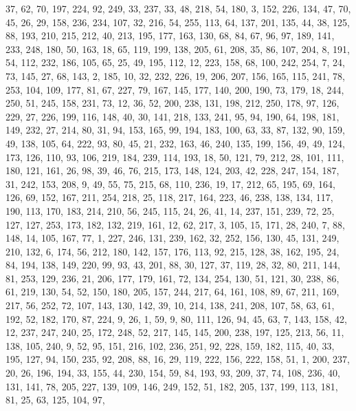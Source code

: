 \begin{DoxyCode}
       37, 62, 70, 197, 224, 92, 249, 33, 237, 33, 48, 218, 54, 180, 3, 152, 226, 134, 47, 70, 45, 26, 29, 158, 236,
       234, 107, 32, 216, 54, 255, 113, 64, 137, 201, 135, 44, 38, 125, 88, 193, 210, 215, 212, 40, 213, 195, 177,
       163, 130, 68, 84, 67, 96, 97, 189, 141, 233, 248, 180, 50, 163, 18, 65, 119, 199, 138, 205, 61, 208, 35, 86,
       107, 204, 8, 191, 54, 112, 232, 186, 105, 65, 25, 49, 195, 112, 12, 223, 158, 68, 100, 242, 254, 7, 24, 73,
       145, 27, 68, 143, 2, 185, 10, 32, 232, 226, 19, 206, 207, 156, 165, 115, 241, 78, 253, 104, 109, 177, 81,
       67, 227, 79, 167, 145, 177, 140, 200, 190, 73, 179, 18, 244, 250, 51, 245, 158, 231, 73, 12, 36, 52, 200,
       238, 131, 198, 212, 250, 178, 97, 126, 229, 27, 226, 199, 116, 148, 40, 30, 141, 218, 133, 241, 95, 94, 190,
       64, 198, 181, 149, 232, 27, 214, 80, 31, 94, 153, 165, 99, 194, 183, 100, 63, 33, 87, 132, 90, 159, 49, 138,
       105, 64, 222, 93, 80, 45, 21, 232, 163, 46, 240, 135, 199, 156, 49, 49, 124, 173, 126, 110, 93, 106, 219,
       184, 239, 114, 193, 18, 50, 121, 79, 212, 28, 101, 111, 180, 121, 161, 26, 98, 39, 46, 76, 215, 173, 148, 124,
       203, 42, 228, 247, 154, 187, 31, 242, 153, 208, 9, 49, 55, 75, 215, 68, 110, 236, 19, 17, 212, 65, 195, 69,
       164, 126, 69, 152, 167, 211, 254, 218, 25, 118, 217, 164, 223, 46, 238, 138, 134, 117, 190, 113, 170, 183,
       214, 210, 56, 245, 115, 24, 26, 41, 14, 237, 151, 239, 72, 25, 127, 127, 253, 173, 182, 132, 219, 161, 12,
       62, 217, 3, 105, 15, 171, 28, 240, 7, 88, 148, 14, 105, 167, 77, 1, 227, 246, 131, 239, 162, 32, 252, 156,
       130, 45, 131, 249, 210, 132, 6, 174, 56, 212, 180, 142, 157, 176, 113, 92, 215, 128, 38, 162, 195, 24, 84, 194,
       138, 149, 220, 99, 93, 43, 201, 88, 30, 127, 37, 119, 28, 32, 80, 211, 144, 81, 253, 129, 236, 21, 206,
       177, 179, 161, 72, 134, 254, 130, 51, 121, 30, 238, 86, 61, 219, 130, 54, 52, 150, 180, 205, 157, 244, 217, 64,
       161, 108, 89, 67, 211, 169, 217, 56, 252, 72, 107, 143, 130, 142, 39, 10, 214, 138, 241, 208, 107, 58, 63,
       61, 192, 52, 182, 170, 87, 224, 9, 26, 1, 59, 9, 80, 111, 126, 94, 45, 63, 7, 143, 158, 42, 12, 237, 247,
       240, 25, 172, 248, 52, 217, 145, 145, 200, 238, 197, 125, 213, 56, 11, 138, 105, 240, 9, 52, 95, 151, 216,
       102, 236, 251, 92, 228, 159, 182, 115, 40, 33, 195, 127, 94, 150, 235, 92, 208, 88, 16, 29, 119, 222, 156, 222,
       158, 51, 1, 200, 237, 20, 26, 196, 194, 33, 155, 44, 230, 154, 59, 84, 193, 93, 209, 37, 74, 108, 236, 40,
       131, 141, 78, 205, 227, 139, 109, 146, 249, 152, 51, 182, 205, 137, 199, 113, 181, 81, 25, 63, 125, 104, 97,

\end{DoxyCode}

